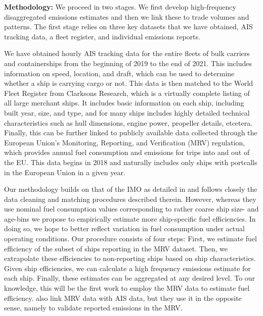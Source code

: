 \documentclass[hidelinks, 12pt,letterpaper]{article}
\begin{document}
\smallskip 

\noindent \textbf{Methodology:} We proceed in two stages. We first develop high-frequency disaggregated emissions estimates and then we link these to trade volumes and patterns. The first stage relies on three key datasets that we have obtained, AIS tracking data, a fleet register, and individual emissions reports.

We have obtained hourly AIS tracking data for the entire fleets of bulk carriers and containerships from the beginning of 2019 to the end of 2021. This includes information on speed, location, and draft, which can be used to determine whether a ship is carrying cargo or not. This data is then matched to the World Fleet Register from Clarksons Research, which is a virtually complete listing of all large merchant ships. It includes basic  information on each ship, including built year, size, and type, and for many ships includes highly detailed technical characteristics such as hull dimensions, engine power, propeller details, etcetera. Finally, this can be further linked to publicly available data collected through the European Union's Monitoring, Reporting, and Verification (MRV) regulation, which provides annual fuel consumption and emissions for trips into and out of the EU. This data begins in 2018 and naturally includes only ships with portcalls in the European Union in a given year.

Our methodology builds on that of the IMO as detailed in \citet{faber2020fourth} and follows closely the data cleaning and matching procedures described therein. However, whereas they use nominal fuel consumption values corresponding to rather coarse ship size- and age-bins we propose to empirically estimate more ship-specific fuel efficiencies. In doing so, we hope to better reflect variation in fuel consumption under actual operating conditions. Our procedure consists of four steps: First, we estimate fuel efficiency of the subset of ships reporting in the MRV dataset. Then, we extrapolate these efficiencies to non-reporting ships based on ship characteristics. Given ship efficiencies, we can calculate a high frequency emissions estimate for each ship. Finally, these estimates can be aggregated at any desired level. To our knowledge, this will be the first work to employ the MRV data to estimate fuel efficiency. \citet{uge2020estimation} also link MRV data with AIS data, but they use it in the opposite sense, namely to validate reported emissions in the MRV.
\end{document}
